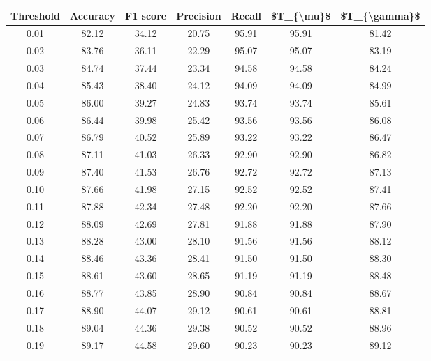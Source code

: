 \begin{tabular}{|c|c|c|c|c|c|c|}
\hline
 Threshold &  Accuracy &  F1 score &  Precision &  Recall &  \$T\_\{\textbackslash mu\}\$ &  \$T\_\{\textbackslash gamma\}\$ \\
\hline
      0.01 &     82.12 &     34.12 &      20.75 &   95.91 &      95.91 &         81.42 \\
      0.02 &     83.76 &     36.11 &      22.29 &   95.07 &      95.07 &         83.19 \\
      0.03 &     84.74 &     37.44 &      23.34 &   94.58 &      94.58 &         84.24 \\
      0.04 &     85.43 &     38.40 &      24.12 &   94.09 &      94.09 &         84.99 \\
      0.05 &     86.00 &     39.27 &      24.83 &   93.74 &      93.74 &         85.61 \\
      0.06 &     86.44 &     39.98 &      25.42 &   93.56 &      93.56 &         86.08 \\
      0.07 &     86.79 &     40.52 &      25.89 &   93.22 &      93.22 &         86.47 \\
      0.08 &     87.11 &     41.03 &      26.33 &   92.90 &      92.90 &         86.82 \\
      0.09 &     87.40 &     41.53 &      26.76 &   92.72 &      92.72 &         87.13 \\
      0.10 &     87.66 &     41.98 &      27.15 &   92.52 &      92.52 &         87.41 \\
      0.11 &     87.88 &     42.34 &      27.48 &   92.20 &      92.20 &         87.66 \\
      0.12 &     88.09 &     42.69 &      27.81 &   91.88 &      91.88 &         87.90 \\
      0.13 &     88.28 &     43.00 &      28.10 &   91.56 &      91.56 &         88.12 \\
      0.14 &     88.46 &     43.36 &      28.41 &   91.50 &      91.50 &         88.30 \\
      0.15 &     88.61 &     43.60 &      28.65 &   91.19 &      91.19 &         88.48 \\
      0.16 &     88.77 &     43.85 &      28.90 &   90.84 &      90.84 &         88.67 \\
      0.17 &     88.90 &     44.07 &      29.12 &   90.61 &      90.61 &         88.81 \\
      0.18 &     89.04 &     44.36 &      29.38 &   90.52 &      90.52 &         88.96 \\
      0.19 &     89.17 &     44.58 &      29.60 &   90.23 &      90.23 &         89.12 \\

\end{tabular}
